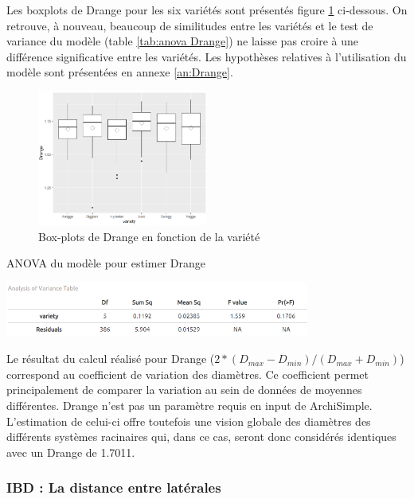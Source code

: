 Les boxplots de Drange pour les six variétés sont présentés figure \ref{fig:boxplot Drange} ci-dessous.
On retrouve, à nouveau, beaucoup de similitudes entre les variétés et le test de variance du modèle (table \ref{tab:anova Drange}) ne laisse pas croire à une différence significative entre les variétés.
Les hypothèses relatives à l'utilisation du modèle sont présentées en annexe \ref{an:Drange}.
\newpage

\begin{figure}[ht]
\centering
\includegraphics[width=0.5\textwidth]{Image/boxplot Drange.png}
\caption{Box-plots de Drange en fonction de la variété}
\label{fig:boxplot Drange}
\end{figure}

\begin{table}[ht]
    \centering
    \caption{ANOVA du modèle pour estimer Drange}
    \includegraphics[width=0.75\textwidth]{Image/anova Drange.png}
    \label{tab:anova Drange}
\end{table}

Le résultat du calcul réalisé pour Drange ($2*(D_{max}-D_{min})/(D_{max}+D_{min})$) correspond au coefficient de variation des diamètres.
Ce coefficient permet principalement de comparer la variation au sein de données de moyennes différentes.
Drange n'est pas un paramètre requis en input de ArchiSimple.
L'estimation de celui-ci offre toutefois une vision globale des diamètres des différents systèmes racinaires qui, dans ce cas, seront donc considérés identiques avec un Drange de 1.7011.

\subsubsection{IBD : La distance entre latérales}

